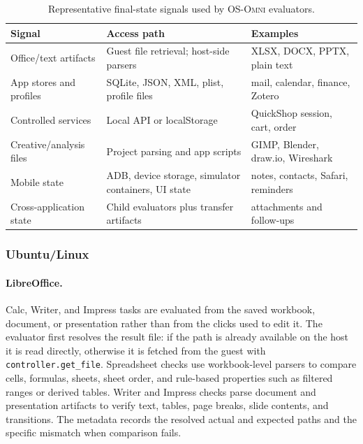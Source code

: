 \begin{table}[ht]
\centering
\caption{Representative final-state signals used by \textsc{OS-Omni} evaluators.}
\label{tab:evaluation_signal_types}
\small
\setlength{\tabcolsep}{5pt}
\renewcommand{\arraystretch}{1.15}
\begin{tabular}{p{3.1cm}p{5.0cm}p{4.1cm}}
\toprule
Signal & Access path & Examples \\
\midrule
Office/text artifacts & Guest file retrieval; host-side parsers & XLSX, DOCX, PPTX, plain text \\
\midrule
App stores and profiles & SQLite, JSON, XML, plist, profile files & mail, calendar, finance, Zotero \\
\midrule
Controlled services & Local API or localStorage & QuickShop session, cart, order \\
\midrule
Creative/analysis files & Project parsing and app scripts & GIMP, Blender, draw.io, Wireshark \\
\midrule
Mobile state & ADB, device storage, simulator containers, UI state & notes, contacts, Safari, reminders \\
\midrule
Cross-application state & Child evaluators plus transfer artifacts & attachments and follow-ups \\
\bottomrule
\end{tabular}
\end{table}

\subsubsection{Ubuntu/Linux}
\paragraph{LibreOffice.}
Calc, Writer, and Impress tasks are evaluated from the saved workbook, document, or presentation rather than from the clicks used to edit it. The evaluator first resolves the result file: if the path is already available on the host it is read directly, otherwise it is fetched from the guest with \texttt{controller.get\_file}. Spreadsheet checks use workbook-level parsers to compare cells, formulas, sheets, sheet order, and rule-based properties such as filtered ranges or derived tables. Writer and Impress checks parse document and presentation artifacts to verify text, tables, page breaks, slide contents, and transitions. The metadata records the resolved actual and expected paths and the specific mismatch when comparison fails.

